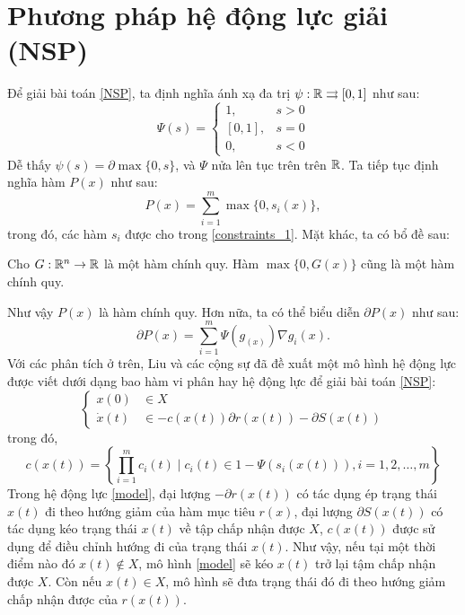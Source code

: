 \section{Phương pháp hệ động lực giải (NSP)}
Để giải bài toán \eqref{NSP}, ta định nghĩa ánh xạ đa trị $\psi: \mathbb{R} \rightrightarrows [0,1]$ như sau:
\begin{equation}
    \label{Psi}
    \Psi(s) = 
    \begin{cases}
        1, &s > 0\\
        [0, 1], & s= 0\\
        0, & s < 0
    \end{cases}
\end{equation}
Dễ thấy $\psi (s) = \partial \max \{0, s\}$, và $\Psi$ nửa lên tục trên trên $\mathbb{R}$. Ta tiếp tục định nghĩa hàm $P(x)$ như sau:
\begin{equation}
    P(x) = \sum_{i=1}^m \max \{0, s_i(x) \},
\end{equation}
trong đó, các hàm $s_i$ được cho trong \eqref{constraints_1}. Mặt khác, ta có bổ đề sau:
\begin{md}
    Cho $G: \mathbb{R}^n \to \mathbb{R}$ là một hàm chính quy. Hàm $\max \{0, G(x) \}$ cũng là một hàm chính quy.
\end{md}
\indent Như vậy $P(x)$ là hàm chính quy. Hơn nữa, ta có thể biểu diễn $\partial P(x)$ như sau:
\begin{equation}
    \label{dP}
    \partial P(x) = \sum_{i=1}^m \Psi(g_(x)) \nabla g_i(x).
\end{equation}
Với các phân tích ở trên, Liu và các cộng sự \cite{Liu2021} đã đề xuất một mô hình hệ động lực được viết dưới dạng bao hàm vi phân hay hệ động lực để giải bài toán \eqref{NSP}:
\begin{equation}
    \label{model}
    \begin{cases}
        x(0) &\in X \\
        \dot x(t) &\in-c(x(t)) \partial r(x(t))-\partial S(x(t))
    \end{cases}
\end{equation}
trong đó,
\begin{equation}
    c(x(t))=\left\{\prod_{i=1}^{m} c_i(t) \mid c_i(t) \in 1-\Psi\left(s_i(x(t))\right), i=1,2, \ldots, m\right\}
\end{equation}
\indent Trong hệ động lực \eqref{model}, đại lượng $-\partial r(x(t))$ có tác dụng ép trạng thái $x(t)$ đi theo hướng giảm của hàm mục tiêu $r(x)$, đại lượng $\partial S(x(t))$ có tác dụng kéo trạng thái $x(t)$ về tập chấp nhận được $X$, $c(x(t))$ được sử dụng để điều chỉnh hướng đi của trạng thái $x(t)$. Như vậy, nếu tại một thời điểm nào đó $x(t) \notin X$, mô hình \eqref{model} sẽ kéo $x(t)$ trở lại tậm chấp nhận được $X$. Còn nếu $x(t) \in X$, mô hình sẽ đưa trạng thái đó đi theo hướng giảm chấp nhận được của $r(x(t))$.

